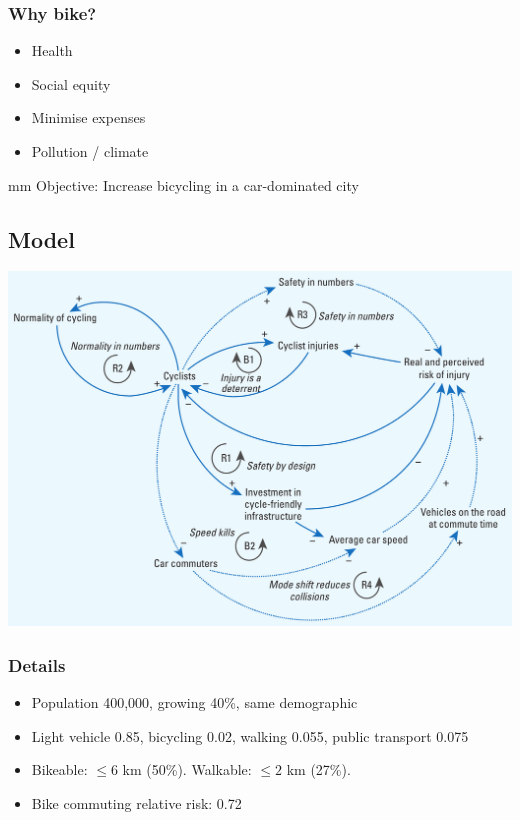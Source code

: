 \documentclass{beamer}
\begin{document}
\begin{frame}
  \frametitle{Why bike?}
  \begin{itemize}
  \item Health
  \item Social equity
  \item Minimise expenses
  \item Pollution / climate
  \end{itemize}
   mm
  Objective:   Increase bicycling in a car-dominated city
\end{frame}

\subsection{Model}

\begin{frame}
  \includegraphics[width=\textwidth]{Macmillan-sd-model.jpg}
\end{frame}

\begin{frame}
  \frametitle{Details}
  \begin{itemize}
  \item Population 400,000, growing 40\%, same demographic
  \item Light vehicle 0.85, bicycling 0.02, walking 0.055, public transport 0.075
  \item Bikeable: $\le 6$ km (50\%). Walkable: $\le 2$ km (27\%).
  \item Bike commuting relative risk: 0.72
  \end{itemize}
\end{frame}
\end{document}
